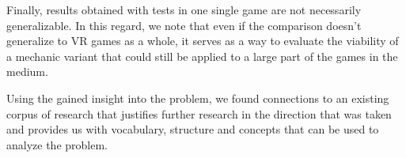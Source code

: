 Finally, results obtained with tests in one single game are not necessarily generalizable. In this regard, we note that even if the comparison doesn't generalize to VR games as a whole, it serves as a way to evaluate the viability of a mechanic variant that could still be applied to a large part of the games in the medium.

Using the gained insight into the problem, we found connections to an existing corpus of research that justifies further research in the direction that was taken and provides us with vocabulary, structure and concepts that can be used to analyze the problem.